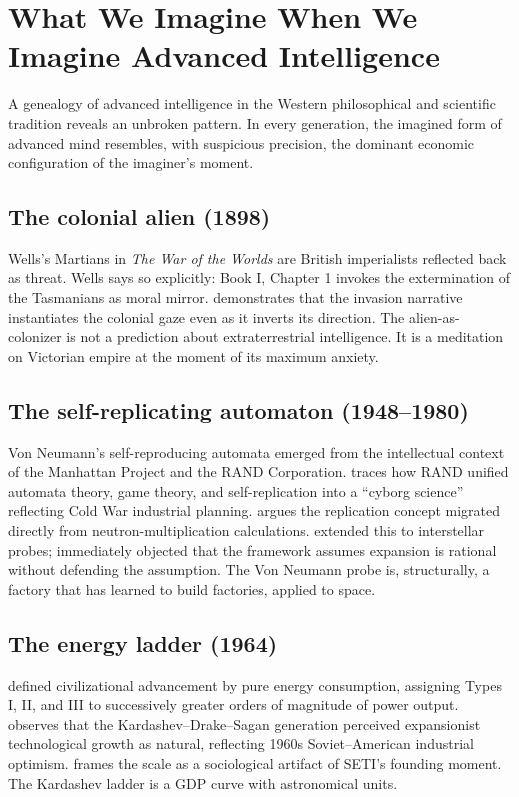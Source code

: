 \documentclass[11pt,twocolumn]{article}
\begin{document}
\section{What We Imagine When We Imagine Advanced Intelligence}

A genealogy of advanced intelligence in the Western philosophical and
scientific tradition reveals an unbroken pattern. In every generation, the
imagined form of advanced mind resembles, with suspicious precision, the
dominant economic configuration of the imaginer's moment.

\subsection{The colonial alien (1898)}

Wells's Martians in \emph{The War of the Worlds} are British imperialists
reflected back as threat. Wells says so explicitly: Book I, Chapter 1
invokes the extermination of the Tasmanians as moral mirror. \citet{Rieder2008}
demonstrates that the invasion narrative instantiates the colonial gaze even
as it inverts its direction. The alien-as-colonizer is not a prediction
about extraterrestrial intelligence. It is a meditation on Victorian empire
at the moment of its maximum anxiety.

\subsection{The self-replicating automaton (1948--1980)}

Von Neumann's self-reproducing automata emerged from the intellectual
context of the Manhattan Project and the RAND Corporation.
\citet{Mirowski2002} traces how RAND unified automata theory, game theory,
and self-replication into a ``cyborg science'' reflecting Cold War
industrial planning. \citet{Heims1980} argues the replication concept
migrated directly from neutron-multiplication calculations.
\citet{Tipler1980} extended this to interstellar probes;
\citet{SaganNewman1983} immediately objected that the framework assumes
expansion is rational without defending the assumption. The Von Neumann
probe is, structurally, a factory that has learned to build factories,
applied to space.

\subsection{The energy ladder (1964)}

\citet{Kardashev1964} defined civilizational advancement by pure energy
consumption, assigning Types I, II, and III to successively greater orders
of magnitude of power output. \citet{Cirkovic2015} observes that the
Kardashev--Drake--Sagan generation perceived expansionist technological
growth as natural, reflecting 1960s Soviet--American industrial optimism.
\citet{Dick1996} frames the scale as a sociological artifact of SETI's
founding moment. The Kardashev ladder is a GDP curve with astronomical
units.
\end{document}
